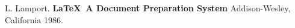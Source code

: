 \begin{thebibliography}{99}
  
   L. Lamport. {\bf \LaTeX \ A Document Preparation System}
    Addison-Wesley, California 1986.

\end{thebibliography}
